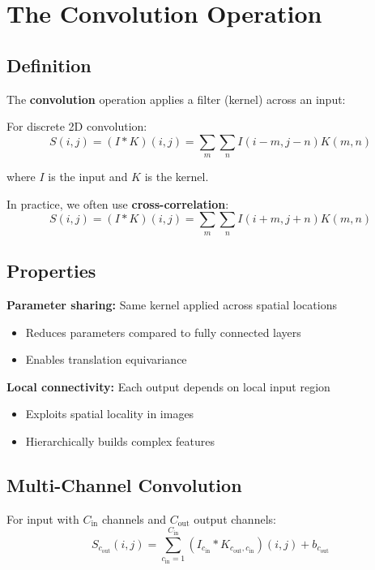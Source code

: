 
\section{The Convolution Operation}
\label{sec:convolution}

\subsection{Definition}

The \textbf{convolution} operation applies a filter (kernel) across an input:

For discrete 2D convolution:
\begin{equation}
S(i,j) = (I * K)(i,j) = \sum_m \sum_n I(i-m, j-n) K(m, n)
\end{equation}

where $I$ is the input and $K$ is the kernel.

In practice, we often use \textbf{cross-correlation}:
\begin{equation}
S(i,j) = (I * K)(i,j) = \sum_m \sum_n I(i+m, j+n) K(m, n)
\end{equation}

\subsection{Properties}

\textbf{Parameter sharing:} Same kernel applied across spatial locations
\begin{itemize}
    \item Reduces parameters compared to fully connected layers
    \item Enables translation equivariance
\end{itemize}

\textbf{Local connectivity:} Each output depends on local input region
\begin{itemize}
    \item Exploits spatial locality in images
    \item Hierarchically builds complex features
\end{itemize}

\subsection{Multi-Channel Convolution}

For input with $C_{\text{in}}$ channels and $C_{\text{out}}$ output channels:
\begin{equation}
S_{c_{\text{out}}}(i,j) = \sum_{c_{\text{in}}=1}^{C_{\text{in}}} (I_{c_{\text{in}}} * K_{c_{\text{out}}, c_{\text{in}}})(i,j) + b_{c_{\text{out}}}
\end{equation}

